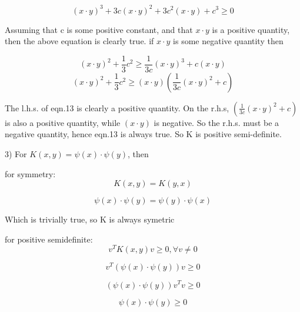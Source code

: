 \documentclass[12pt]{article}
\begin{document}
\begin{equation}
     (x \cdot y)^3 + 3c(x \cdot y)^2 + 3c^2(x \cdot y) + c^3 \geq 0
\end{equation}

Assuming that c is some positive constant, and that $x \cdot y$ is a positive quantity, then the above equation is 
clearly true. if $x \cdot y$ is some negative quantity then

\begin{equation}
     (x \cdot y)^2 + \frac{1}{3}c^2 \geq \frac{1}{3c}(x \cdot y)^3  + c(x \cdot y)
\end{equation}
\begin{equation}
     (x \cdot y)^2 + \frac{1}{3}c^2 \geq (x \cdot y)\left(\frac{1}{3c}(x \cdot y)^2  + c\right)
\end{equation}

The l.h.s. of eqn.13 is clearly a positive quantity. On the r.h.s, $\left(\frac{1}{3c}(x \cdot y)^2  + c\right)$ is 
also a positive quantity, while $(x \cdot y)$ is negative. So the r.h.s. must be a negative quantity, hence 
eqn.13 is always true. So K is positive semi-definite. 


\pagebreak
\setcounter{equation}{0}
3) For $K(x,y) = \psi(x)\cdot \psi(y)$, then

for symmetry: 
\begin{equation}
    K(x,y) = K(y,x) 
\end{equation}

\begin{equation}
    \psi(x)\cdot \psi(y) = \psi(y)\cdot \psi(x)
\end{equation}

Which is trivially true, so K is always symetric

for positive semidefinite: 
\begin{equation}
    v^T K(x,y) v \geq 0, \forall v\neq 0
\end{equation}

\begin{equation}
    v^T \left(\psi(x)\cdot \psi(y)\right) v \geq 0
\end{equation}

\begin{equation}
    \left(\psi(x)\cdot \psi(y)\right)v^T  v \geq 0
\end{equation}

\begin{equation}
    \psi(x)\cdot \psi(y) \geq 0
\end{equation}
\end{document}
